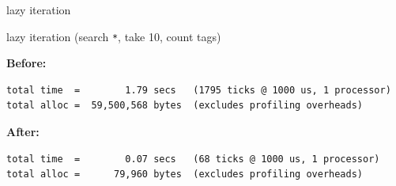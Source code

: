 \documentclass[ignorenonframetext,aspectratio=169]{beamer}
\newenvironment{Shaded}{}{}
\newcommand{\KeywordTok}[1]{\textcolor[rgb]{0.00,0.44,0.13}{\textbf{{#1}}}}
\newcommand{\DataTypeTok}[1]{\textcolor[rgb]{0.56,0.13,0.00}{{#1}}}
\newcommand{\DecValTok}[1]{\textcolor[rgb]{0.25,0.63,0.44}{{#1}}}
\newcommand{\OtherTok}[1]{\textcolor[rgb]{0.00,0.44,0.13}{{#1}}}
\newcommand{\FunctionTok}[1]{\textcolor[rgb]{0.02,0.16,0.49}{{#1}}}
\newcommand{\NormalTok}[1]{{#1}}
\begin{document}
\begin{frame}[fragile]{lazy iteration}

\begin{Shaded}
\end{Shaded}

\end{frame}

\begin{frame}[fragile]{lazy iteration (search \texttt{*}, take 10, count
tags)}

{\bf Before:}

\begin{verbatim}
total time  =        1.79 secs   (1795 ticks @ 1000 us, 1 processor)
total alloc =  59,500,568 bytes  (excludes profiling overheads)
\end{verbatim}

{\bf After:}

\begin{verbatim}
total time  =        0.07 secs   (68 ticks @ 1000 us, 1 processor)
total alloc =      79,960 bytes  (excludes profiling overheads)
\end{verbatim}

\end{frame}
\end{document}
